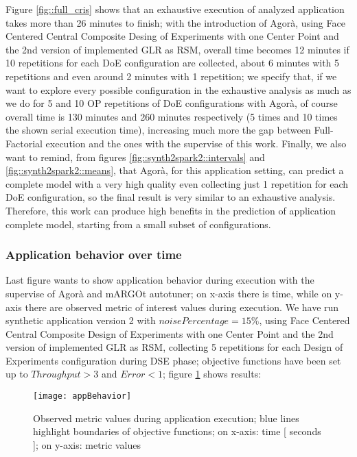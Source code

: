 Figure \ref{fig::full_cris} shows that an exhaustive execution of analyzed application takes more than 26 minutes to finish; with the introduction of Agorà, using Face Centered Central Composite Desing of Experiments with one Center Point and the 2nd version of implemented GLR as RSM, overall time becomes 12 minutes if 10 repetitions for each DoE configuration are collected, about 6 minutes with 5 repetitions and even around 2 minutes with 1 repetition; we specify that, if we want to explore every possible configuration in the exhaustive analysis as much as we do for 5 and 10 OP repetitions of DoE configurations with Agorà, of course overall time is 130 minutes and 260 minutes respectively (5 times and 10 times the shown serial execution time), increasing much more the gap between Full-Factorial execution and the ones with the supervise of this work. Finally, we also want to remind, from figures \ref{fig::synth2spark2::intervals} and \ref{fig::synth2spark2::means}, that Agorà, for this application setting, can predict a complete model with a very high quality even collecting just 1 repetition for each DoE configuration, so the final result is very similar to an exhaustive analysis. Therefore, this work can produce high benefits in the prediction of application complete model, starting from a small subset of configurations.


\subsubsection{Application behavior over time}

Last figure wants to show application behavior during execution with the supervise of Agorà and mARGOt autotuner; on x-axis there is time, while on y-axis there are observed metric of interest values during execution. We have run synthetic application version 2 with $noisePercentage = 15\%$, using Face Centered Central Composite Design of Experiments with one Center Point and the 2nd version of implemented GLR as RSM, collecting 5 repetitions for each Design of Experiments configuration during DSE phase; objective functions have been set up to $Throughput > 3$ and $Error < 1$; figure \ref{fig::appBeh} shows results:

\begin{figure}[H]

    \centering
    \texttt{[image: appBehavior]}
    \caption{Observed metric values during application execution; blue lines highlight boundaries of objective functions; on x-axis: time [ seconds ]; on y-axis: metric values}
    \label{fig::appBeh}
    
\end{figure}

